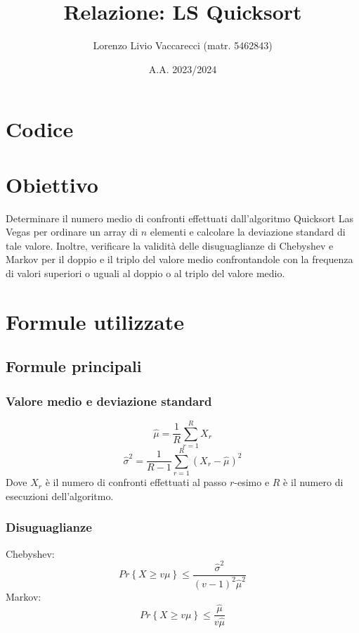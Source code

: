\documentclass[12pt]{article}
\title{Relazione: LS Quicksort}
\author{Lorenzo Livio Vaccarecci (matr. 5462843)}
\date{A.A. 2023/2024}
\begin{document}
\maketitle
\section{Codice}

\section{Obiettivo}
Determinare il numero medio di confronti effettuati 
dall'algoritmo Quicksort Las Vegas per ordinare un array di $n$ 
elementi e calcolare la deviazione standard di tale valore. Inoltre, 
verificare la validità delle disuguaglianze di Chebyshev e Markov per 
il doppio e il triplo del valore medio confrontandole con la frequenza
di valori superiori o uguali al doppio o al triplo del valore medio.
\section{Formule utilizzate}
\subsection{Formule principali}
\subsubsection{Valore medio e deviazione standard}
\begin{equation}
    \hat{\mu} = \frac{1}{R}\sum_{r=1}^{R}X_{r} 
\end{equation}
\begin{equation}
    \hat{\sigma}^{2} = \frac{1}{R-1}\sum_{r=1}^{R}(X_{r}-\hat{\mu})^{2}
\end{equation}
Dove $X_{r}$ è il numero di confronti effettuati al passo $r$-esimo e $R$ 
è il numero di esecuzioni dell'algoritmo.
\subsubsection{Disuguaglianze}
Chebyshev:
\begin{equation}
    Pr\left\{X\geq v\mu\right\}\leq\frac{\hat{\sigma}^{2}}{(v-1)^{2}\hat{\mu}^{2}}
\end{equation}
Markov:
\begin{equation}
    Pr\left\{X\geq v\mu\right\}\leq\frac{\hat{\mu}}{v\hat{\mu}}
\end{equation}
\end{document}

